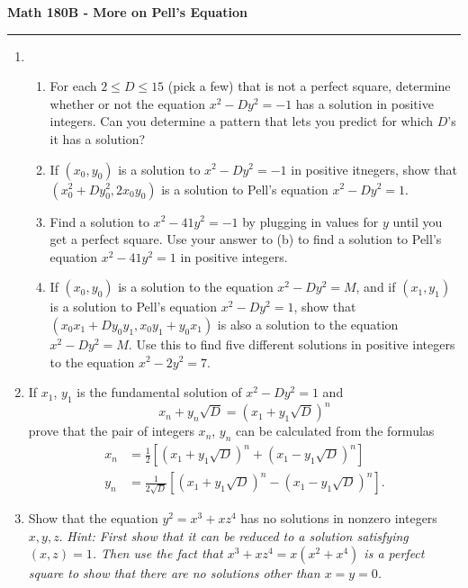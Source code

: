 \documentclass[11pt,letterpaper]{report}
\begin{document}
\begin{center}
{\bf \Large Math 180B - More on Pell's Equation}
\vspace{0.2cm}
\hrule
\end{center}

\begin{enumerate}
	\item \begin{enumerate}
		\item For each $2\leq D\leq 15$ (pick a few) that is not a perfect square, determine whether or not the equation $x^2 - Dy^2 = -1$ has a solution in positive integers. Can you determine a pattern that lets you predict for which $D$'s it has a solution?

		\item If $(x_0, y_0)$ is a solution to $x^2-Dy^2 = -1$ in positive itnegers, show that $(x_0^2 + Dy_0^2, 2x_0y_0)$ is a solution to Pell's equation $x^2-Dy^2 = 1$.

		\item Find a solution to $x^2 - 41y^2 = -1$ by plugging in values for $y$ until you get a perfect square. Use your answer to (b) to find a solution to Pell's equation $x^2 - 41y^2 = 1$ in positive integers.

		\item If $(x_0, y_0)$ is a solution to the equation $x^2 - Dy^2 = M$, and if $(x_1, y_1)$ is a solution to Pell's equation $x^2 - Dy^2 = 1$, show that $(x_0x_1 + Dy_0y_1, x_0y_1+y_0x_1)$ is also a solution to the equation $x^2 - Dy^2 = M$. Use this to find five different solutions in positive integers to the equation $x^2 - 2y^2 = 7$.
	\end{enumerate}

	\item If $x_1$, $y_1$ is the fundamental solution of $x^2 - Dy^2 = 1$ and
	\[
	x_n + y_n\sqrt{D} = (x_1+y_1\sqrt{D})^n
	\]
	prove that the pair of integers $x_n$, $y_n$ can be calculated from the formulas
	\begin{align*}
	x_n &= \frac{1}{2}\left[\left(x_1 + y_1\sqrt{D}\right)^n + \left(x_1 - y_1\sqrt{D}\right)^n\right]\\
	y_n &= \frac{1}{2\sqrt{D}}\left[\left(x_1 + y_1\sqrt{D}\right)^n - \left(x_1 - y_1\sqrt{D}\right)^n\right].
	\end{align*}

	\item Show that the equation $y^2 = x^3 + xz^4$ has no solutions in nonzero integers $x,y,z$. \textit{Hint: First show that it can be reduced to a solution satisfying $(x,z) = 1$. Then use the fact that $x^3 + xz^4 = x(x^2+x^4)$ is a perfect square to show that there are no solutions other than $x= y= 0$.}
\end{enumerate}
\end{document}
